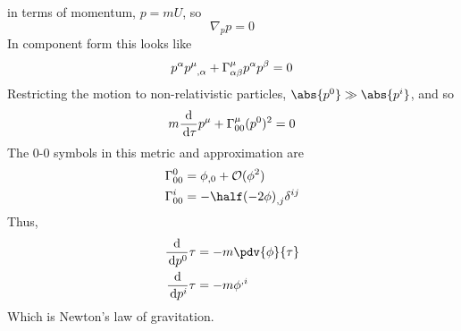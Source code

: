 in terms of momentum, $p = m U$, so
\begin{equation}
  \label{eq:106}
  \nabla_p p = 0
\end{equation}
In component form this looks like
\begin{equation}
  \label{eq:107}
  p^{\alpha} \tensor{p}{^{\mu}_{,\alpha}} + \Gamma^{\mu}_{\alpha \beta} p^{\alpha} p^{\beta} = 0
\end{equation}
Restricting the motion to non-relativistic particles, $\abs{p^0} \gg \abs{p^i}$, and so
\begin{equation}
  \label{eq:108}
  m \frac{\mathrm{d}}{\,\mathrm{d} \tau} p^{\mu} + \Gamma_{00}^{\mu} (p^0)^2 = 0
\end{equation}
The 0-0 symbols in this metric and approximation are
\begin{subequations}
  \begin{align}
    \label{eq:110}
    \Gamma^0_{00} &= \phi_{,0} + \mathcal{O}(\phi^2) \\
\label{eq:111}
\Gamma_{00}^i &= -\half \tensor{(-2 \phi)}{_{,j}} \delta^{ij}
  \end{align}
\end{subequations}
Thus,
\begin{subequations}
  \begin{align}
    \label{eq:113}
    \dv{p^0}{\tau} &= -m \pdv{\phi}{\tau} \\
    \label{eq:114}
\dv{p^i}{\tau} &= -m \phi^{,i}
  \end{align}
\end{subequations}
Which is Newton's law of gravitation.

